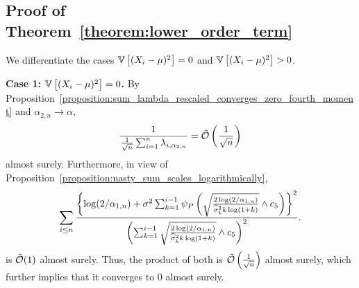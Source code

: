 \subsection{Proof of Theorem~\ref{theorem:lower_order_term}} \label{proof:lower_order_term}

We differentiate the cases $\mathbb{V} \left[ (X_i-\mu)^2\right] = 0$ and $\mathbb{V} \left[ (X_i-\mu)^2\right] > 0$.

\textbf{Case 1: $\mathbb{V} \left[ (X_i-\mu)^2\right] = 0$.} By Proposition~\ref{proposition:sum_lambda_rescaled_converges_zero_fourth_moment} and $\alpha_{2, n} \to \alpha$,
 \begin{align*}
    \frac{1}{\frac{1}{\sqrt{n}} \sum_{i = 1}^n \lambda_{i,\alpha_{2, n}}} = \tilde {\mathcal{O}} \left( \frac{1}{\sqrt n} \right)
\end{align*}
almost surely. Furthermore, in view of Proposition~\ref{proposition:nasty_sum_scales_logarithmically},
\begin{align*}
    \sum_{i \leq n} \frac{\left\{ \log(2/\alpha_{1,n}) + \sigma^2\sum_{k=1}^{i-1} \psi_P\left(\sqrt\frac{2\log(2/\alpha_{1,n})}{\widehat \sigma_{k}^2 k \log (1+k)}\wedge c_5\right)\right\}^2}{\left( \sum_{k=1}^{i-1} \sqrt\frac{2\log(2/\alpha_{1,n})}{\widehat \sigma_{k}^2 k \log (1+k)} \wedge c_5\right)^2}.
\end{align*}
is $\tilde{\mathcal{O}} (1)$ almost surely. Thus, the product of both is $\tilde {\mathcal{O}} \left( \frac{1}{\sqrt n} \right)$ almost surely, which further implies that it converges to $0$ almost surely.  


